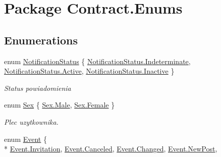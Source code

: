 \hypertarget{namespace_contract_1_1_enums}{}\section{Package Contract.\+Enums}
\label{namespace_contract_1_1_enums}
\subsection*{Enumerations}
\begin{DoxyCompactItemize}
\item 
enum \hyperlink{namespace_contract_1_1_enums_acc3ee7ff530d140749aef3196a50ae4c}{Notification\+Status} \{ \hyperlink{namespace_contract_1_1_enums_acc3ee7ff530d140749aef3196a50ae4caa2d00c353d1f9a5f07852650030dbd53}{Notification\+Status.\+Indeterminate}, 
\hyperlink{namespace_contract_1_1_enums_acc3ee7ff530d140749aef3196a50ae4ca4d3d769b812b6faa6b76e1a8abaece2d}{Notification\+Status.\+Active}, 
\hyperlink{namespace_contract_1_1_enums_acc3ee7ff530d140749aef3196a50ae4ca3cab03c00dbd11bc3569afa0748013f0}{Notification\+Status.\+Inactive}
 \}
\begin{DoxyCompactList}\small\item\em Status powiadomienia \end{DoxyCompactList}\item 
enum \hyperlink{namespace_contract_1_1_enums_aabaa9dcad8ec43294f16c7ec913b5db3}{Sex} \{ \hyperlink{namespace_contract_1_1_enums_aabaa9dcad8ec43294f16c7ec913b5db3a63889cfb9d3cbe05d1bd2be5cc9953fd}{Sex.\+Male}, 
\hyperlink{namespace_contract_1_1_enums_aabaa9dcad8ec43294f16c7ec913b5db3ab719ce180ec7bd9641fece2f920f4817}{Sex.\+Female}
 \}
\begin{DoxyCompactList}\small\item\em Plec uzytkownika. \end{DoxyCompactList}\item 
enum \hyperlink{namespace_contract_1_1_enums_a195bd5eea92e011927a1913b01a0c517}{Event} \{ \\*
\hyperlink{namespace_contract_1_1_enums_a195bd5eea92e011927a1913b01a0c517a0ba011066a589576daee32a58e9b81cd}{Event.\+Invitation}, 
\hyperlink{namespace_contract_1_1_enums_a195bd5eea92e011927a1913b01a0c517a0e22fe7d45f8e5632a4abf369b24e29c}{Event.\+Canceled}, 
\hyperlink{namespace_contract_1_1_enums_a195bd5eea92e011927a1913b01a0c517a820dbd2b8f606aff866c0bbfb6b737c1}{Event.\+Changed}, 
\hyperlink{namespace_contract_1_1_enums_a195bd5eea92e011927a1913b01a0c517a259c1c770e50e24813c7e9280f80e484}{Event.\+New\+Post}, 

\end{DoxyCompactItemize}
